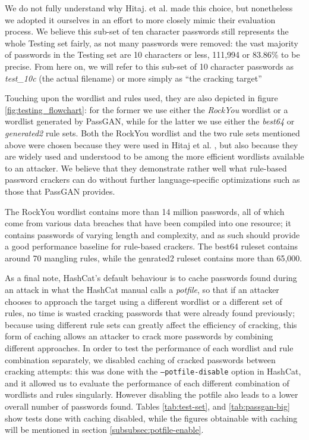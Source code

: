 We do not fully understand why Hitaj. et al. made this choice, but nonetheless we adopted it ourselves in an effort to more closely mimic their evaluation process.
\clearpage
We believe this sub-set of ten character passwords still represents the whole Testing set fairly, as not many passwords were removed: the vast majority of passwords in the Testing set are 10 characters or less, 111,994 or 83.86\% to be precise. 
From here on, we will refer to this sub-set of 10 character passwords as \emph{test\_10c} (the actual filename) or more simply as \enquote{the cracking target}

Touching upon the wordlist and rules used, they are also depicted in figure \ref{fig:testing_flowchart}: for the former we use either the \emph{RockYou} wordlist or a wordlist generated by PassGAN, while for the latter we use either the \emph{best64} or \emph{generated2} rule sets. Both the RockYou wordlist and the two rule sets mentioned above were chosen because they were used in Hitaj et al. \cite{PassGAN}, but also because they are widely used and understood to be among the more efficient wordlists available to an attacker. We believe that they demonstrate rather well what rule-based password crackers can do without further language-specific optimizations such as those that PassGAN provides. %

The RockYou wordlist contains more than 14 million passwords, all of which come from various data breaches that have been compiled into one resource; it contains passwords of varying length and complexity, and as such should provide a good performance baseline for rule-based crackers. The best64 ruleset contains around 70 mangling rules, while the genrated2 ruleset contains more than 65,000. 

As a final note, HashCat's default behaviour is to cache passwords found during an attack in what the HashCat manual calls a \emph{potfile}, so that if an attacker chooses to approach the target using a different wordlist or a different set of rules, no time is wasted cracking passwords that were already found previously; because using different rule sets can greatly affect the efficiency of cracking, this form of caching allows an attacker to crack more passwords by combining different approaches.
In order to test the performance of each wordlist and rule combination separately, we disabled caching of cracked passwords between cracking attempts: this was done with the \texttt{--potfile-disable} option in HashCat, and it allowed us to evaluate the performance of each different combination of wordlists and rules singularly. However disabling the potfile also leads to a lower overall number of passwords found. Tables \ref{tab:test-set}, and \ref{tab:passgan-big} show tests done with caching disabled, while the figures obtainable with caching will be mentioned in section \ref{subsubsec:potfile-enable}. 

